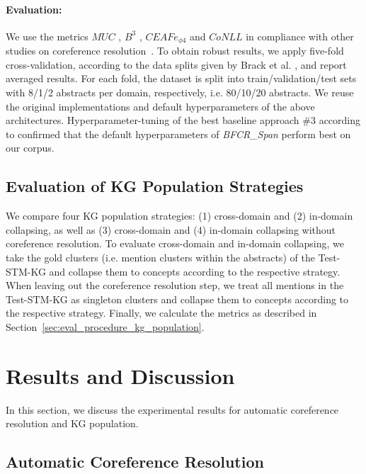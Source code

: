 \documentclass[runningheads]{llncs}
\begin{document}
\paragraph{Evaluation:}
We use the metrics $MUC$ \cite{VilainBACH95MUC}, $B^3$ \cite{Bagga98B3}, $CEAFe_{\phi 4}$ \cite{Luo05CEAF} and $CoNLL$ \cite{Pradhan2014Scoring} in compliance with other studies on coreference resolution~\cite{Joshi2020BFCR,Ma0LHPSL20JointlyCoreference,Lee2017EndtoendNC}.
To obtain robust results, we apply five-fold cross-validation, according to the data splits given by Brack et al. \cite{Brack2020DomainindependentEO}, and report averaged results.
For each fold, the dataset is split into train/validation/test sets with 8/1/2 abstracts per domain, respectively, i.e. 80/10/20 abstracts.  
We reuse the original implementations and default hyperparameters of the above architectures. 
Hyperparameter-tuning of the best baseline approach \#3 according to \cite{Joshi2020BFCR} confirmed that the default hyperparameters of \emph{BFCR\_Span} perform best on our corpus.

\subsection{Evaluation of KG Population Strategies}

We compare four KG population strategies: (1) cross-domain and (2) in-domain collapsing, as well as (3) cross-domain and (4) in-domain collapsing without coreference resolution. 
To evaluate cross-domain and in-domain collapsing, we take the gold clusters (i.e. mention clusters within the abstracts) of the Test-STM-KG and collapse them to concepts according to the respective strategy.
When leaving out the coreference resolution step, we treat all mentions in the Test-STM-KG as singleton clusters and collapse them to concepts according to the respective strategy. Finally, we calculate the metrics as described in Section~\ref{sec:eval_procedure_kg_population}.



\section{Results and Discussion}
In this section, we discuss the experimental results for automatic coreference resolution and KG population. 



\subsection{Automatic Coreference Resolution}
\end{document}
